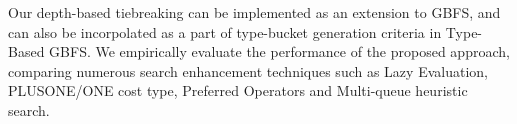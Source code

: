 Our depth-based tiebreaking can be implemented as an extension to GBFS, and
can also be incorpolated as a part of type-bucket generation criteria in
Type-Based GBFS.  We empirically evaluate the performance of the
proposed approach, comparing numerous search enhancement techniques such
as Lazy Evaluation, PLUS\-ONE/ONE cost type, Preferred Operators and
Multi-queue heuristic search.

